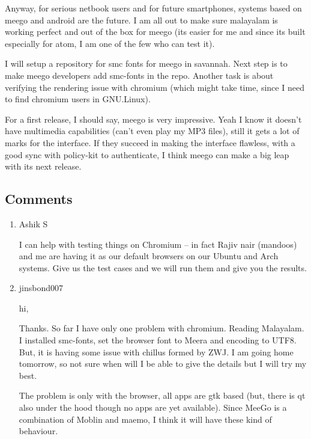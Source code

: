 Anyway, for serious netbook users and for future smartphones, systems based on meego and android are the 
future. I am all out to make sure malayalam is working perfect and out of the box for meego (its easier 
for me and since its built especially for atom, I am one of the few who can test it).

I will setup a repository for smc fonts for meego in savannah. Next step is to make meego developers add smc-fonts 
in the repo. Another task is about verifying the rendering issue with chromium (which might take time, since I need to 
find chromium users in GNU.Linux).

For a first release, I should say, meego is very impressive. Yeah I know it doesn't have multimedia capabilities (can't even 
play my MP3 files), still it gets a lot of marks for the interface. If they succeed in making the interface flawless, 
with a good sync with policy-kit to authenticate, I think meego can make a big leap with its next release.


\subsection*{Comments}
\begin{enumerate}
 \item{Ashik S}
 
I can help with testing things on Chromium – in fact Rajiv nair (mandoos) and me are having it as our default browsers on 
our Ubuntu and Arch systems. Give us the test cases and we will run them and give you the results.

 \item{jinsbond007}
 
hi,

Thanks. So far I have only one problem with chromium. Reading Malayalam.
I installed smc-fonts, set the browser font to Meera and encoding to UTF8. But, it is having some issue with chillus 
formed by ZWJ.
I am going home tomorrow, so not sure when will I be able to give the details but I will try my best. 

The problem is only with the browser, all apps are gtk based (but, there is qt also under the hood though no apps 
are yet available). Since MeeGo is a combination of Moblin and maemo, I think it will have these kind of behaviour. 

\end{enumerate}

\newpage 
